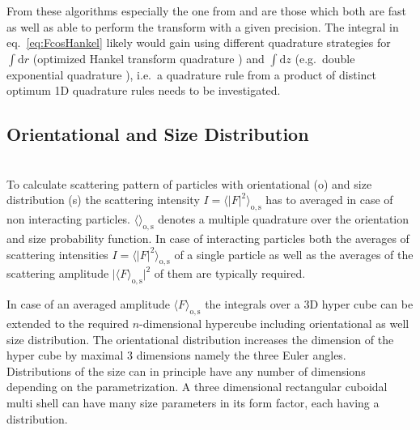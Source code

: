 From these algorithms especially the one from \cite{Ooura_1991} and \cite{Chave1983} are those which  both are fast as well as able to perform the transform with a given precision. The integral in eq.\ \ref{eq:FcosHankel} likely would gain using different quadrature strategies for $\int\mathrm{d}r$ (optimized Hankel transform quadrature \cite{Chave1983}) and $\int\mathrm{d}z$ (e.g.\ double exponential quadrature \cite{Mori2001,Mori1990}), i.e.\ a quadrature rule from a product of distinct optimum 1D quadrature rules needs to be investigated.

\subsection{Orientational and Size Distribution} ~\\

To calculate scattering pattern of particles with orientational (o) and size distribution (s) the scattering intensity $I=\langle \vert F\vert^2\rangle_\mathrm{o,s}$ has to averaged in case of non interacting particles. $\langle \rangle_\mathrm{o,s}$ denotes a multiple quadrature over the orientation and size probability function. In case of interacting particles both the averages of scattering intensities $I=\langle \vert F\vert^2\rangle_\mathrm{o,s}$ of a single particle  as well as the averages of the scattering amplitude $\vert\langle F\rangle_\mathrm{o,s}\vert^2$ of them are typically required.

In case of an averaged amplitude $\langle F\rangle_\mathrm{o,s}$ the integrals over a 3D hyper cube can be extended to the required $n$-dimensional hypercube including orientational as well size distribution. The orientational distribution increases the dimension of the hyper cube by maximal 3 dimensions namely the three Euler angles. Distributions of the size can in principle have any number of dimensions depending on the parametrization. A three dimensional rectangular cuboidal multi shell can have many size parameters in its form factor, each having a distribution.

